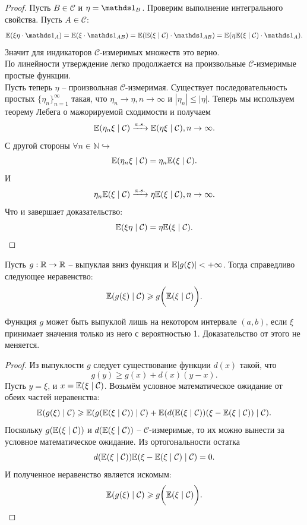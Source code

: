 \begin{proof}
    Пусть $B \in \mathcal{C}$ и $\eta = \Ind_{B}$. Проверим выполнение интегрального свойства. Пусть $A \in \mathcal{C}$:
    \[
        \Ex(\xi \eta \cdot \Ind_{A}) = \Ex(\xi \cdot \Ind_{AB}) = \Ex(\Ex(\xi \mid \mathcal{C}) \cdot \Ind_{AB}) = \Ex(\eta \Ex(\xi \mid \mathcal{C}) \cdot \Ind_{A}).
    \]
    Значит для индикаторов $\mathcal{C}$-измеримых множеств это верно. \\
    По линейности утверждение легко продолжается на произвольные $\mathcal{C}$-измеримые простые функции. \\
    Пусть теперь $\eta$ -- произвольная $\mathcal{C}$-измеримая. Существует последовательность простых $\{\eta_n\}_{n = 1}^\infty$ такая, что $\eta_n \rightarrow \eta, n \rightarrow \infty$ и $|\eta_n| \leq |\eta|$. Теперь мы используем теорему Лебега о мажорируемой сходимости и получаем
    \[
        \mathbb{E}(\eta_n \xi \mid \mathcal{C}) \xrightarrow{a.s.} \mathbb{E}(\eta \xi \mid \mathcal{C}), n \rightarrow \infty.
    \]
    С другой стороны $\forall n \in \mathbb{N} \hookrightarrow$
    \[
        \mathbb{E}(\eta_n \xi \mid \mathcal{C}) = \eta_n \mathbb{E}(\xi \mid \mathcal{C}).
    \]
    И 
    \[
        \eta_n \mathbb{E}(\xi \mid \mathcal{C}) \xrightarrow{a.s.} \eta \mathbb{E}(\xi \mid \mathcal{C}), n \rightarrow \infty.
    \]
    Что и завершает доказательство:
    \[
        \mathbb{E}(\xi \eta \mid \mathcal{C}) = \eta \mathbb{E}(\xi \mid \mathcal{C}).
    \]
\end{proof}
\begin{property}
    Пусть $g: \mathbb{R} \to \mathbb{R}$ -- выпуклая вниз функция и $\mathbb{E}|g(\xi)| < +\infty$. 
    Тогда справедливо следующее неравенство:
    \[
        \mathbb{E}(g(\xi)\mid \mathcal{C}) \geqslant g\biggr(\mathbb{E}(\xi\mid \mathcal{C})\biggr).
    \]
\end{property}
\begin{note}
    Функция $g$ может быть выпуклой лишь на некотором интервале $(a, b)$, если $\xi$ принимает значения только из него с вероятностью 1. Доказательство от этого не меняется.
\end{note}
\begin{proof}
    Из выпуклости $g$ следует существование функции $d(x)$ такой, что 
    \[
        g(y) \geq g(x) + d(x) (y - x).
    \]
    Пусть $y = \xi$, и $x = \mathbb{E}(\xi \mid \mathcal{C})$. Возьмём условное математическое ожидание от обеих частей неравенства:
    \[
        \mathbb{E}(g(\xi)\mid \mathcal{C}) \geqslant \mathbb{E}(g(\mathbb{E} (\xi \mid \mathcal{C})) \mid \mathcal{C}) + \mathbb{E}(d(\mathbb{E}(\xi\mid \mathcal{C}))(\xi - \mathbb{E}(\xi \mid \mathcal{C})) \mid \mathcal{C}).
    \]
    Поскольку $g(\mathbb{E} (\xi \mid \mathcal{C}))$ и $d(\mathbb{E} (\xi \mid \mathcal{C}))$ -- $\mathcal{C}$-измеримые, то их можно вынести за условное математическое ожидание. Из ортогональности остатка \[d(\mathbb{E}(\xi \mid \mathcal{C}))\mathbb{E}(\xi - \mathbb{E}(\xi \mid \mathcal{C}) \mid \mathcal{C}) = 0.\] И полученное неравенство является искомым:
    \[
        \mathbb{E}(g(\xi)\mid \mathcal{C}) \geqslant g\biggr(\mathbb{E}(\xi\mid \mathcal{C})\biggr).
    \]
\end{proof}
